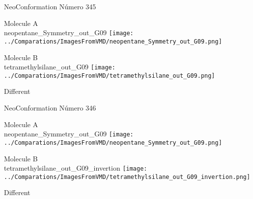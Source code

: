 \vtab[-2cm]
\begin{center}
{\large NeoConformation \tab Número 345}
\end{center}
\begin{multicols}{2}
\begin{center}
Molecule A \\ 
neopentane\_Symmetry\_out\_G09
\texttt{[image: ../Comparations/ImagesFromVMD/neopentane\_Symmetry\_out\_G09.png]}
\\
\vtab

\columnbreak
Molecule B \\ 
tetramethylsilane\_out\_G09
\texttt{[image: ../Comparations/ImagesFromVMD/tetramethylsilane\_out\_G09.png]}
\\
\vtab


\end{center}
\end{multicols}
\begin{center}
\vtab
\vtab
\textcolor{NavyBlue}{\Large Different}
\end{center}

 \newpage

\vtab[-2cm]
\begin{center}
{\large NeoConformation \tab Número 346}
\end{center}
\begin{multicols}{2}
\begin{center}
Molecule A \\ 
neopentane\_Symmetry\_out\_G09
\texttt{[image: ../Comparations/ImagesFromVMD/neopentane\_Symmetry\_out\_G09.png]}
\\
\vtab

\columnbreak
Molecule B \\ 
tetramethylsilane\_out\_G09\_invertion
\texttt{[image: ../Comparations/ImagesFromVMD/tetramethylsilane\_out\_G09\_invertion.png]}
\\
\vtab


\end{center}
\end{multicols}
\begin{center}
\vtab
\vtab
\textcolor{NavyBlue}{\Large Different}
\end{center}

 \newpage

